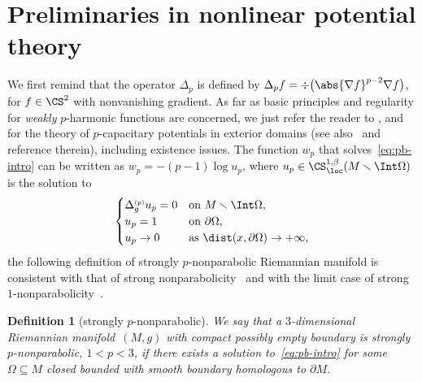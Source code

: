 \documentclass[10pt,a4paper]{amsart}
\numberwithin{equation}{section}
\newtheorem{Definition}[Theorem]{Definition}
\newcounter{case}
\newcommand{\tp}[1][p]{{\text{\tiny$(#1)$}}}
\begin{document}
\section{Preliminaries in nonlinear potential theory}
\label{sec:2}
We first remind that the operator $\Delta_p$ is defined by $\Delta_p f = \div \big(\abs{\nabla f}^{p-2}\nabla f\big)$, for $f \in \CS^2$ with nonvanishing gradient.
As far as basic principles and regularity for \emph{weakly} $p$-harmonic functions are concerned, we just refer the reader to
\cite{dibenedetto_alphalocalregularityweak_1983,evans_newprooflocal1_1982,heinonen_asuperharmonicfunctionssupersolutionsdegenerate_1988,ladyzenskaja_linearquasilinearellipticequations_1968,lewis_regularityderivativessolutionscertain_1983,lieberman_boundaryregularitysolutionsdegenerate_1988,serrin_localbehaviorsolutionsquasilinear_1964,tolksdorf_dirichletproblemquasilinearequations_1983,trudinger_harnacktypeinequalitiestheir_1967,uraltseva_degeneratequasilinearellipticsystems_1968,valtorta_laplaceoperatorriemannianmanifolds_2013}, and~\cite{holopainen_nonlinearpotentialtheoryquasiregular_1990,holopainen_volumegrowthgreenfunctions_1999} for the theory of $p$-capacitary potentials in exterior domains (see also~\cite[Chapter 1]{benatti_monotonicityformulasnonlinearpotential_2022} and reference therein), including existence issues. The function $w_p$ that solves~\eqref{eq:pb-intro} can be written as $w_p= -(p-1)\log u_p$, where $u_p \in \CS^{1,\beta}_{\loc}(M \smallsetminus \Int \Omega)$ is the solution to
\begin{equation}\label{eq:p-cap-potential}
 \begin{cases}
 \Delta^{\tp}_g u_p = 0 &\text{on $M \smallsetminus \Int \Omega$,}\\
 u_p=1 & \text{on $\partial \Omega$,}\\
 u_p\to 0 & \text{as $\dist(x,\partial \Omega)\to +\infty$,}
 \end{cases}
\end{equation}
the following definition of strongly $p$-nonparabolic Riemannian manifold is consistent with that of strong nonparabolicity~\cite{ni_meanvaluetheoremsmanifolds_2007} and with the limit case of strong $1$-nonparabolicity~\cite{benatti_isoperimetricriemannianpenroseinequality_2022}.

\begin{Definition}[strongly $p$-nonparabolic]
We say that a $3$-dimensional Riemannian manifold~$(M,g)$ with compact possibly empty boundary is \emph{strongly $p$-nonparabolic}, $1<p<3$, if there exists a solution to~\eqref{eq:pb-intro} for some $\Omega \subseteq M$ closed bounded with smooth boundary homologous to $\partial M$.
\end{Definition}
\end{document}
